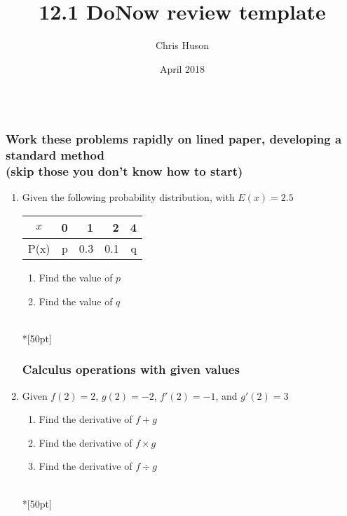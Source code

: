 \documentclass[12pt, oneside]{article}
\title{12.1 DoNow review template}
\author{Chris Huson}
\date{April 2018}
\begin{document}
\subsubsection*{\\ \textnormal{Work these problems rapidly on lined paper, developing a standard method \\(skip those you don't know how to start)}}

\begin{enumerate}
\subsubsection*{Expected value given table (fair)}
\item Given the following probability distribution, with $E(x)=2.5$\\
\begin{tabular}{|c|r|r|r|r|}
\hline 
$x$ & 0 & 1 & 2 & 4 \\ 
\hline 
P(x) & p & 0.3 & 0.1 & q  \\ 
\hline 
\end{tabular}
\begin{enumerate}
    \item Find the value of $p$
    \item Find the value of $q$
\end{enumerate}\\*[50pt]

\subsubsection*{Calculus operations with given values}
\item Given $f(2)=2$, $g(2)=-2$, $f'(2)=-1$, and $g'(2)=3$
\begin{enumerate}
    \item Find the derivative of $f+g$
    \item Find the derivative of $f \times g$
    \item Find the derivative of $f \div g$
\end{enumerate}\\*[50pt]

\newpage

\end{enumerate}
\end{document}
